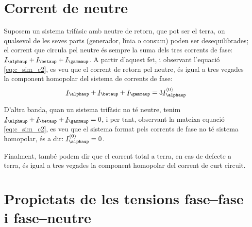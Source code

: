 \section{Corrent de neutre} 

Suposem un sistema trif\`{a}sic amb neutre de retorn, que pot ser el
terra, on qualsevol de les seves parts (generador, l\'{\i}nia o consum)
poden ser desequilibrades; el corrent que circula pel neutre \'{e}s
sempre la suma dels tres corrents de fase: $\cmplx{I}_\alphaup+
\cmplx{I}_\betaup+\cmplx{I}_\gammaup$. A partir d'aquest fet, i
observant l'equaci\'{o} \eqref{eq:c_sim_c2}, es veu que el corrent de
retorn pel neutre, \'{e}s igual a tres vegades la component homopolar
del sistema de corrents de fase:
\begin{equation}
    \cmplx{I}_\alphaup+\cmplx{I}_\betaup+\cmplx{I}_\gammaup =3 \cmplx{I}_\alphaup\ap{(0)}
\end{equation}

D'altra banda, quan un sistema trif\`{a}sic no t\'{e} neutre, tenim
$\cmplx{I}_\alphaup+ \cmplx{I}_\betaup+\cmplx{I}_\gammaup=0$, i per tant,
observant la mateixa equaci\'{o} \eqref{eq:c_sim_c2}, es veu que el
sistema format pels corrents de fase no t\'{e} sistema homopolar, \'{e}s a dir: $\cmplx{I}_\alphaup\ap{(0)}=0$.

Finalment, tamb\'{e} podem dir que el corrent total a terra, en cas de
defecte a terra, \'{e}s igual a tres vegades la component homopolar del
corrent de curt circuit.

\section{Propietats de les tensions fase--fase i fase--neutre}\label{sec:comp-sim-neutre}
 

